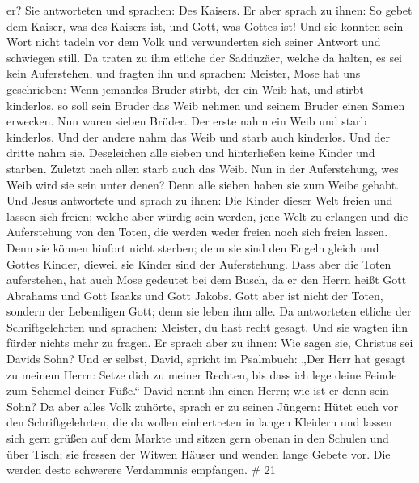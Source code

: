 er? Sie antworteten und sprachen: Des Kaisers.  Er aber
sprach zu ihnen: So gebet dem Kaiser, was des Kaisers ist, und Gott, was
Gottes ist!  Und sie konnten sein Wort nicht tadeln vor dem
Volk und verwunderten sich seiner Antwort und schwiegen still.
 Da traten zu ihm etliche der Sadduzäer, welche da halten,
es sei kein Auferstehen, und fragten ihn  und sprachen:
Meister, Mose hat uns geschrieben: Wenn jemandes Bruder stirbt, der ein
Weib hat, und stirbt kinderlos, so soll sein Bruder das Weib nehmen und
seinem Bruder einen Samen erwecken.  Nun waren sieben
Brüder. Der erste nahm ein Weib und starb kinderlos.  Und
der andere nahm das Weib und starb auch kinderlos.  Und der
dritte nahm sie. Desgleichen alle sieben und hinterließen keine Kinder
und starben.  Zuletzt nach allen starb auch das Weib.
 Nun in der Auferstehung, wes Weib wird sie sein unter
denen? Denn alle sieben haben sie zum Weibe gehabt.  Und
Jesus antwortete und sprach zu ihnen: Die Kinder dieser Welt freien und
lassen sich freien;  welche aber würdig sein werden, jene
Welt zu erlangen und die Auferstehung von den Toten, die werden weder
freien noch sich freien lassen.  Denn sie können hinfort
nicht sterben; denn sie sind den Engeln gleich und Gottes Kinder,
dieweil sie Kinder sind der Auferstehung.  Dass aber die
Toten auferstehen, hat auch Mose gedeutet bei dem Busch, da er den Herrn
heißt Gott Abrahams und Gott Isaaks und Gott Jakobs.  Gott
aber ist nicht der Toten, sondern der Lebendigen Gott; denn sie leben
ihm alle.  Da antworteten etliche der Schriftgelehrten und
sprachen: Meister, du hast recht gesagt.  Und sie wagten
ihn fürder nichts mehr zu fragen.  Er sprach aber zu ihnen:
Wie sagen sie, Christus sei Davids Sohn?  Und er selbst,
David, spricht im Psalmbuch: „Der Herr hat gesagt zu meinem Herrn: Setze
dich zu meiner Rechten,  bis dass ich lege deine Feinde zum
Schemel deiner Füße.``  David nennt ihn einen Herrn; wie
ist er denn sein Sohn?  Da aber alles Volk zuhörte, sprach
er zu seinen Jüngern:  Hütet euch vor den Schriftgelehrten,
die da wollen einhertreten in langen Kleidern und lassen sich gern
grüßen auf dem Markte und sitzen gern obenan in den Schulen und über
Tisch;  sie fressen der Witwen Häuser und wenden lange
Gebete vor. Die werden desto schwerere Verdammnis empfangen. \# 21
